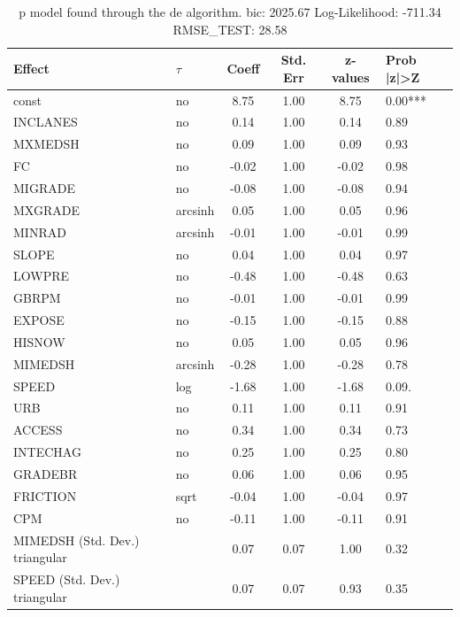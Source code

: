 \begin{table}
	\caption{p model found through the de algorithm. bic: 2025.67 Log-Likelihood: -711.34 RMSE_TEST: 28.58}
	\begin{center}
		\begin{tabular}{|l|l|c|c|c|l|}
			\hline
			Effect & $\tau$ & Coeff & Std. Err & z-values & Prob |z|>Z \\
			\hline
			const & no & 8.75 & 1.00 & 8.75 & 0.00*** \\
			\hline
			INCLANES & no & 0.14 & 1.00 & 0.14 & 0.89 \\
			\hline
			MXMEDSH & no & 0.09 & 1.00 & 0.09 & 0.93 \\
			\hline
			FC & no & -0.02 & 1.00 & -0.02 & 0.98 \\
			\hline
			MIGRADE & no & -0.08 & 1.00 & -0.08 & 0.94 \\
			\hline
			MXGRADE & arcsinh & 0.05 & 1.00 & 0.05 & 0.96 \\
			\hline
			MINRAD & arcsinh & -0.01 & 1.00 & -0.01 & 0.99 \\
			\hline
			SLOPE & no & 0.04 & 1.00 & 0.04 & 0.97 \\
			\hline
			LOWPRE & no & -0.48 & 1.00 & -0.48 & 0.63 \\
			\hline
			GBRPM & no & -0.01 & 1.00 & -0.01 & 0.99 \\
			\hline
			EXPOSE & no & -0.15 & 1.00 & -0.15 & 0.88 \\
			\hline
			HISNOW & no & 0.05 & 1.00 & 0.05 & 0.96 \\
			\hline
			MIMEDSH & arcsinh & -0.28 & 1.00 & -0.28 & 0.78 \\
			\hline
			SPEED & log & -1.68 & 1.00 & -1.68 & 0.09. \\
			\hline
			URB & no & 0.11 & 1.00 & 0.11 & 0.91 \\
			\hline
			ACCESS & no & 0.34 & 1.00 & 0.34 & 0.73 \\
			\hline
			INTECHAG & no & 0.25 & 1.00 & 0.25 & 0.80 \\
			\hline
			GRADEBR & no & 0.06 & 1.00 & 0.06 & 0.95 \\
			\hline
			FRICTION & sqrt & -0.04 & 1.00 & -0.04 & 0.97 \\
			\hline
			CPM & no & -0.11 & 1.00 & -0.11 & 0.91 \\
			\hline
			MIMEDSH (Std. Dev.) triangular &  & 0.07 & 0.07 & 1.00 & 0.32 \\
			\hline
			SPEED (Std. Dev.) triangular &  & 0.07 & 0.07 & 0.93 & 0.35 \\
			\hline

\end{tabular}
\end{center}
\end{table}
